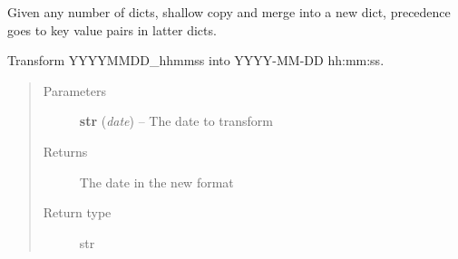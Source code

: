 \documentclass[a4paper,10pt,english]{sphinxmanual}
\begin{document}

\begin{fulllineitems}
\label{commands/apidoc/src:src.__init__.merge_dicts}
Given any number of dicts, shallow copy and merge into a new dict,
precedence goes to key value pairs in latter dicts.

\end{fulllineitems}


\begin{fulllineitems}
\label{commands/apidoc/src:src.__init__.only_numbers}
\end{fulllineitems}


\begin{fulllineitems}
\label{commands/apidoc/src:src.__init__.parse_date}
Transform YYYYMMDD\_hhmmss into YYYY-MM-DD hh:mm:ss.
\begin{quote}\begin{description}
\item[{Parameters}] \leavevmode
\textbf{str} (\emph{date}) -- The date to transform

\item[{Returns}] \leavevmode
The date in the new format

\item[{Return type}] \leavevmode
str

\end{description}\end{quote}

\end{fulllineitems}

\end{document}
